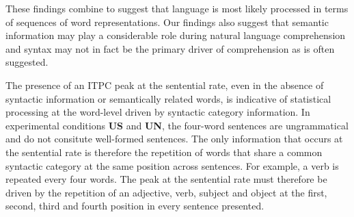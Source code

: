 \documentclass[a4paper,10pt,twoside]{article}
\begin{document}
%
% 
%
These findings combine to suggest that language is most likely
processed in terms of sequences of word representations. Our findings
also suggest that semantic information may play a considerable role
during natural language comprehension and syntax may not in fact be
the primary driver of comprehension as is often suggested.

The presence of an ITPC peak at the sentential rate, even in the
absence of syntactic information or semantically related words, is
indicative of statistical processing at the word-level driven by
syntactic category information. 
%
%
%
%
%
%
%
In experimental conditions \textbf{US} and \textbf{UN}, the four-word sentences are
ungrammatical and do not consitute well-formed sentences. The only
information that occurs at the sentential rate is therefore the
repetition of words that share a common syntactic category at the same
position across sentences. For example, a verb is repeated every four
words. The peak at the sentential rate must therefore be driven by the
repetition of an adjective, verb, subject and object at the first,
second, third and fourth position in every sentence presented.
%
%
%
%
%
%
%
%
\end{document}
